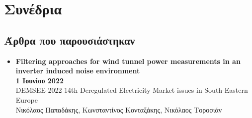 \documentclass[a4paper,9pt]{extarticle}
\begin{document}



\section*{Συνέδρια}

\subsection*{Άρθρα που παρουσιάστηκαν}
\begin{itemize}
  \item{\textbf{Filtering approaches for wind tunnel power measurements in an inverter
        induced noise environment}} \\
        \textbf{1 Ιουνίου 2022} \\
        DEMSEE-2022 14th Deregulated Electricity Market issues in South-Eastern Europe \\
        Νικόλαος Παπαδάκης, Κωνσταντίνος Κονταξάκης, Νικόλαος Τοροσιάν
\end{itemize}


\end{document}
